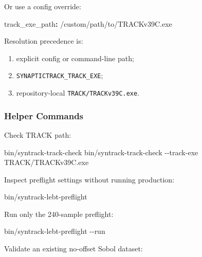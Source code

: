 \documentclass[
]{article}
\newenvironment{Shaded}{}{}
\newcommand{\AttributeTok}[1]{\textcolor[rgb]{0.49,0.56,0.16}{#1}}
\newcommand{\ExtensionTok}[1]{#1}
\newcommand{\FunctionTok}[1]{\textcolor[rgb]{0.02,0.16,0.49}{#1}}
\newcommand{\KeywordTok}[1]{\textcolor[rgb]{0.00,0.44,0.13}{\textbf{#1}}}
\newcommand{\NormalTok}[1]{#1}
\providecommand{\tightlist}{%
  \setlength{\itemsep}{0pt}\setlength{\parskip}{0pt}}
\begin{document}
Or use a config override:

\begin{Shaded}
\begin{Highlighting}[]
\FunctionTok{track\_exe\_path}\KeywordTok{:}\AttributeTok{ /custom/path/to/TRACKv39C.exe}
\end{Highlighting}
\end{Shaded}

Resolution precedence is:

\begin{enumerate}
\def\labelenumi{\arabic{enumi}.}
\tightlist
\item
  explicit config or command-line path;
\item
  \texttt{SYNAPTICTRACK\_TRACK\_EXE};
\item
  repository-local \texttt{TRACK/TRACKv39C.exe}.
\end{enumerate}

\hypertarget{helper-commands}{%
\subsubsection{Helper Commands}\label{helper-commands}}

Check TRACK path:

\begin{Shaded}
\begin{Highlighting}[]
\ExtensionTok{bin/syntrack{-}track{-}check}
\ExtensionTok{bin/syntrack{-}track{-}check} \AttributeTok{{-}{-}track{-}exe}\NormalTok{ TRACK/TRACKv39C.exe}
\end{Highlighting}
\end{Shaded}

Inspect preflight settings without running production:

\begin{Shaded}
\begin{Highlighting}[]
\ExtensionTok{bin/syntrack{-}lebt{-}preflight}
\end{Highlighting}
\end{Shaded}

Run only the 240-sample preflight:

\begin{Shaded}
\begin{Highlighting}[]
\ExtensionTok{bin/syntrack{-}lebt{-}preflight} \AttributeTok{{-}{-}run}
\end{Highlighting}
\end{Shaded}

Validate an existing no-offset Sobol dataset:
\end{document}
